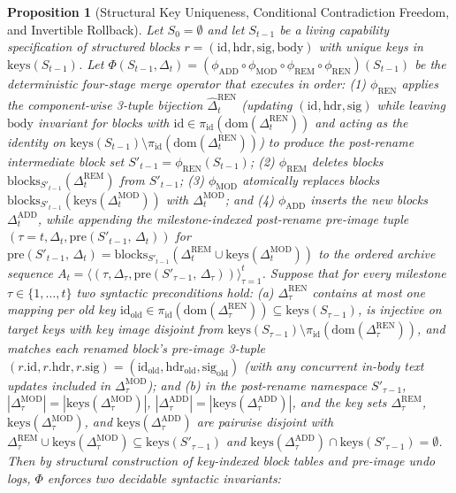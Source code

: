 \documentclass[11pt,a4paper,copyright]{google}
\newtheorem{proposition}{Proposition}
\begin{document}
\begin{proposition}[Structural Key Uniqueness, Conditional Contradiction Freedom, and Invertible Rollback]
Let $S_0 = \emptyset$ and let $S_{t-1}$ be a living capability specification of structured blocks $r = (\text{id}, \text{hdr}, \text{sig}, \text{body})$ with unique keys in $\text{keys}(S_{t-1})$. Let $\Phi(S_{t-1}, \Delta_t) = (\phi_{\text{ADD}} \circ \phi_{\text{MOD}} \circ \phi_{\text{REM}} \circ \phi_{\text{REN}})(S_{t-1})$ be the deterministic four-stage merge operator that executes in order: (1) $\phi_{\text{REN}}$ applies the component-wise 3-tuple bijection $\hat{\Delta}_t^{\text{REN}}$ (updating $(\text{id}, \text{hdr}, \text{sig})$ while leaving $\text{body}$ invariant for blocks with $\text{id} \in \pi_{\text{id}}(\text{dom}(\Delta_t^{\text{REN}}))$ and acting as the identity on $\text{keys}(S_{t-1}) \setminus \pi_{\text{id}}(\text{dom}(\Delta_t^{\text{REN}}))$) to produce the post-rename intermediate block set $S'_{t-1} = \phi_{\text{REN}}(S_{t-1})$; (2) $\phi_{\text{REM}}$ deletes blocks $\text{blocks}_{S'_{t-1}}(\Delta_t^{\text{REM}})$ from $S'_{t-1}$; (3) $\phi_{\text{MOD}}$ atomically replaces blocks $\text{blocks}_{S'_{t-1}}(\text{keys}(\Delta_t^{\text{MOD}}))$ with $\Delta_t^{\text{MOD}}$; and (4) $\phi_{\text{ADD}}$ inserts the new blocks $\Delta_t^{\text{ADD}}$, while appending the milestone-indexed post-rename pre-image tuple $(\tau=t, \Delta_t, \text{pre}(S'_{t-1},\, \Delta_t))$ for $\text{pre}(S'_{t-1},\, \Delta_t) = \text{blocks}_{S'_{t-1}}(\Delta_t^{\text{REM}} \cup \text{keys}(\Delta_t^{\text{MOD}}))$ to the ordered archive sequence $A_t = \langle (\tau, \Delta_\tau, \text{pre}(S'_{\tau-1},\, \Delta_\tau)) \rangle_{\tau=1}^t$. Suppose that for every milestone $\tau \in \{1, \dots, t\}$ two syntactic preconditions hold: (a) $\Delta_\tau^{\text{REN}}$ contains at most one mapping per old key $\text{id}_{\text{old}} \in \pi_{\text{id}}(\text{dom}(\Delta_\tau^{\text{REN}})) \subseteq \text{keys}(S_{\tau-1})$, is injective on target keys with key image disjoint from $\text{keys}(S_{\tau-1}) \setminus \pi_{\text{id}}(\text{dom}(\Delta_\tau^{\text{REN}}))$, and matches each renamed block's pre-image 3-tuple $(r.\text{id}, r.\text{hdr}, r.\text{sig}) = (\text{id}_{\text{old}}, \text{hdr}_{\text{old}}, \text{sig}_{\text{old}})$ (with any concurrent in-body text updates included in $\Delta_\tau^{\text{MOD}}$); and (b) in the post-rename namespace $S'_{\tau-1}$, $|\Delta_\tau^{\text{MOD}}| = |\text{keys}(\Delta_\tau^{\text{MOD}})|$, $|\Delta_\tau^{\text{ADD}}| = |\text{keys}(\Delta_\tau^{\text{ADD}})|$, and the key sets $\Delta_\tau^{\text{REM}}$, $\text{keys}(\Delta_\tau^{\text{MOD}})$, and $\text{keys}(\Delta_\tau^{\text{ADD}})$ are pairwise disjoint with $\Delta_\tau^{\text{REM}} \cup \text{keys}(\Delta_\tau^{\text{MOD}}) \subseteq \text{keys}(S'_{\tau-1})$ and $\text{keys}(\Delta_\tau^{\text{ADD}}) \cap \text{keys}(S'_{\tau-1}) = \emptyset$. Then by structural construction of key-indexed block tables and pre-image undo logs, $\Phi$ enforces two decidable syntactic invariants:

\end{proposition}
\end{document}
